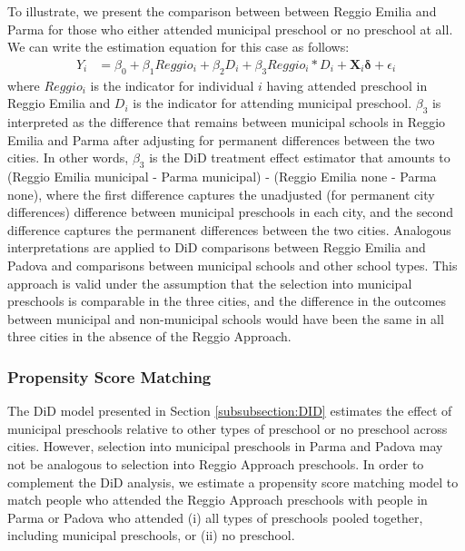 To illustrate, we present the comparison between between Reggio Emilia and Parma for those who either attended municipal preschool or no preschool at all. We can write the estimation equation for this case as follows:
\begin{eqnarray}  \label{eq:specific2}
Y_i & = \beta_0 + \beta_1 Reggio_i + \beta_2 D_i + \beta_3 Reggio_i * D_i + \bm{X}_i \bm{\delta} + \epsilon_i
\end{eqnarray}
\noindent where $Reggio_i$ is the indicator for individual $i$ having attended preschool in Reggio Emilia and $D_i$ is the indicator for attending municipal preschool. $\beta_3$ is interpreted as the difference that remains between municipal schools in Reggio Emilia and Parma after adjusting for permanent differences between the two cities. In other words, $\beta_3$ is the DiD treatment effect estimator that amounts to (Reggio Emilia municipal - Parma municipal) - (Reggio Emilia none - Parma none), where the first difference captures the unadjusted (for permanent city differences) difference between municipal preschools in each city, and the second difference captures the permanent differences between the two cities. Analogous interpretations are applied to DiD comparisons between Reggio Emilia and Padova and comparisons between municipal schools and other school types. This approach is valid under the assumption that the selection into municipal preschools is comparable in the three cities, and the difference in the outcomes between municipal and non-municipal schools would have been the same in all three cities in the absence of the Reggio Approach.

\subsubsection{Propensity Score Matching}

The DiD model presented in Section \ref{subsubsection:DID} estimates the effect of municipal preschools relative to other types of preschool or no preschool across cities. However, selection into municipal preschools in Parma and Padova may not be analogous to selection into Reggio Approach preschools. In order to complement the DiD analysis, we estimate a propensity score matching model to match people who attended the Reggio Approach preschools with people in Parma or Padova who attended (i) all types of preschools pooled together, including municipal preschools, or (ii) no preschool.

